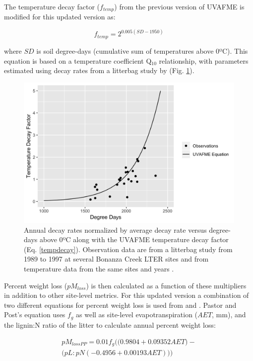 \documentclass[a4paper, 12pt] {report}
\begin{document}
The temperature decay factor ($f_{temp}$) from the previous version of UVAFME is modified for this updated version as:

\begin{equation} \label{tempdecay}
f_{temp} = 2^{0.005(SD - 1950)}
\end{equation}

where $SD$ is soil degree-days (cumulative sum of temperatures above 0ºC). This equation is based on a temperature coefficient Q$_{10}$ relationship, with parameters estimated using decay rates from a litterbag study by  (Fig. \ref{fig:tempfact}).

\begin{figure}
  \includegraphics[width=0.8\linewidth]{Figures/TempFact.png}
  \caption{Annual decay rates normalized by average decay rate versus degree-days above 0ºC along with the UVAFME temperature decay factor (Eq. \ref{tempdecay}). Observation data are from a litterbag study from 1989 to 1997 at several Bonanza Creek LTER sites \protect\cite{yarieLitterbagDecompositionStudy1997} and from temperature data from the same sites and years \protect\cite{vancleveBonanzaCreekLTER2017}.}
  \label{fig:tempfact}
\end{figure}

Percent weight loss ($pM_{loss}$) is then calculated as a function of these multipliers in addition to other site-level metrics. For this updated version a combination of two different equations for percent weight loss is used from  and . Pastor and Post's equation uses $f_g$ as well as site-level evapotranspiration ($AET$, mm), and the lignin:N ratio of the litter to calculate annual percent weight loss:

\begin{equation} \label{ppeq}
  \begin{aligned}
pM_{lossPP} = 0.01f_g\Bigg(\Big(0.9804 + 0.09352AET\Big) - \\
		\Big(pL:pN(-0.4956 + 0.00193AET)\Big)\Bigg)
\end{aligned}
\end{equation}
\end{document}
